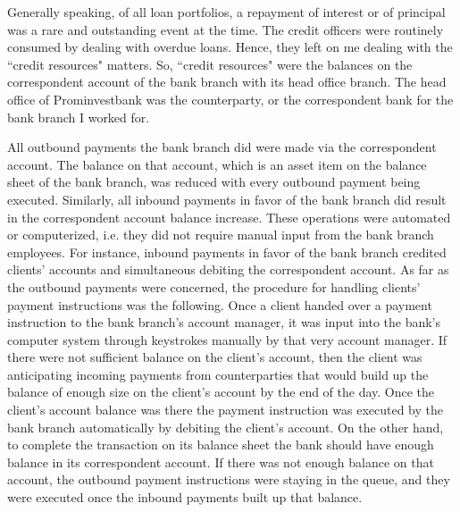 Generally speaking, of all loan portfolios, a repayment of interest or of principal was a rare and outstanding event at the time. The credit officers were routinely consumed by dealing with overdue loans. Hence, they left on me dealing with the ``credit resources" matters. So, ``credit resources" were the balances on the correspondent account of the bank branch with its head office branch. The head office of Prominvestbank was the counterparty, or the correspondent bank for the bank branch I worked for.

All outbound payments the bank branch did were made via the correspondent account. The balance on that account, which is an asset item on the balance sheet of the bank branch, was reduced with every outbound payment being executed. Similarly, all inbound payments in favor of the bank branch did result in the correspondent account balance increase. These operations were automated or computerized, i.e. they did not require manual input from the bank branch employees. For instance, inbound payments in favor of the bank branch credited clients' accounts and simultaneous debiting the correspondent account. As far as the outbound payments were concerned, the procedure for handling clients' payment instructions was the following. Once a client handed over a payment instruction to the bank branch's account manager, it was input into the bank's computer system through keystrokes manually by that very account manager. If there were not sufficient balance on the client's account, then the client was anticipating incoming payments from counterparties that would build up the balance of enough size on the client's account by the end of the day. Once the client's account balance was there the payment instruction was executed by the bank branch automatically by debiting the client's account. On the other hand, to complete the transaction on its balance sheet the bank should have enough balance in its correspondent account. If there was not enough balance on that account, the outbound payment instructions were staying in the queue, and they were executed once the inbound payments built up that balance.

